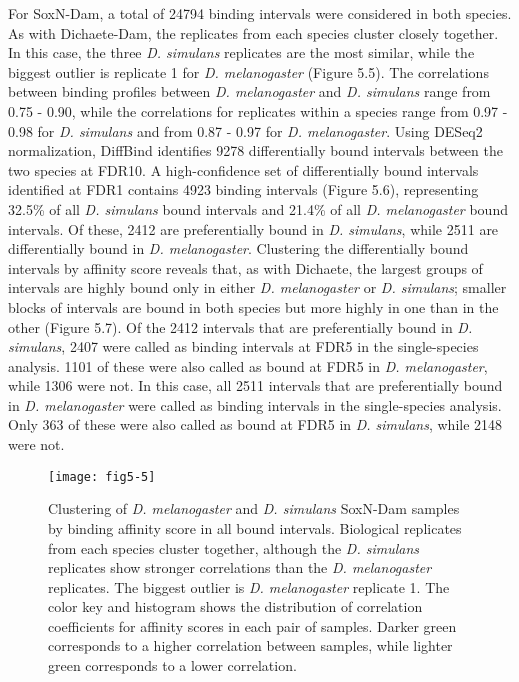 For SoxN-Dam, a total of 24794 binding intervals were considered in both species. As with Dichaete-Dam, the replicates from each species cluster closely together. In this case, the three \emph{D. simulans} replicates are the most similar, while the biggest outlier is replicate 1 for \emph{D. melanogaster} (Figure 5.5). The correlations between binding profiles between \emph{D. melanogaster} and \emph{D. simulans} range from 0.75 - 0.90, while the correlations for replicates within a species range from 0.97 - 0.98 for \emph{D. simulans} and from 0.87 - 0.97 for \emph{D. melanogaster}. Using DESeq2 normalization, DiffBind identifies 9278 differentially bound intervals between the two species at FDR10. A high-confidence set of differentially bound intervals identified at FDR1 contains 4923 binding intervals (Figure 5.6), representing 32.5\% of all \emph{D. simulans} bound intervals and 21.4\% of all \emph{D. melanogaster} bound intervals. Of these, 2412 are preferentially bound in \emph{D. simulans}, while 2511 are differentially bound in \emph{D. melanogaster}. Clustering the differentially bound intervals by affinity score reveals that, as with Dichaete, the largest groups of intervals are highly bound only in either \emph{D. melanogaster} or \emph{D. simulans}; smaller blocks of intervals are bound in both species but more highly in one than in the other (Figure 5.7). Of the 2412 intervals that are preferentially bound in \emph{D. simulans}, 2407 were called as binding intervals at FDR5 in the single-species analysis. 1101 of these were also called as bound at FDR5 in \emph{D. melanogaster}, while 1306 were not. In this case, all 2511 intervals that are preferentially bound in \emph{D. melanogaster} were called as binding intervals in the single-species analysis. Only 363 of these were also called as bound at FDR5 in \emph{D. simulans}, while 2148 were not.

\begin{figure}
\centering
\texttt{[image: fig5-5]}
\caption{Clustering of \emph{D. melanogaster} and \emph{D. simulans} SoxN-Dam samples by binding affinity score in all bound intervals. Biological replicates from each species cluster together, although the \emph{D. simulans} replicates show stronger correlations than the \emph{D. melanogaster} replicates. The biggest outlier is \emph{D. melanogaster} replicate 1. The color key and histogram shows the distribution of correlation coefficients for affinity scores in each pair of samples. Darker green corresponds to a higher correlation between samples, while lighter green corresponds to a lower correlation.}
\label{Figure 5.5}
\end{figure}

